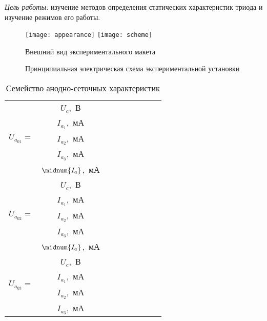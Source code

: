 \documentclass[10pt,pscyr,nonums]{hedlabwork}
\begin{document}
    \makeheader

    \emph{Цель работы:} изучение методов определения статических характеристик
    триода и изучение режимов его работы.
    
    \begin{figure}[h!]
        \center
        \texttt{[image: appearance]} \hspace*{2em}
        \texttt{[image: scheme]}
        \parbox{.45\textwidth}{\caption{Внешний вид экспериментального макета}}
        \hspace*{2em}
        \parbox{.4\textwidth}{\caption{Принципиальная электрическая схема
        экспериментальной установки}}
    \end{figure}
    
    \begin{table}[h!]
        \center
        \caption{Семейство анодно-сеточных характеристик}
        \begin{tabular}{|m{}|*{8}{C{.07}|}} \hline
         & \( U_c \),~В &
            &&&&&& \\ 
        & \( I_{a_1} \),~мА &
            &&&&&& \\ 
        & \( I_{a_2} \),~мА &
            &&&&&& \\ 
        & \( I_{a_3} \),~мА &
            &&&&&& \\ 
        & \( \midnum{I_a} \),~мА &
            &&&&&& \\ \hline
         & \( U_c \),~В &
            &&&&&& \\ 
        & \( I_{a_1} \),~мА &
            &&&&&& \\ 
        & \( I_{a_2} \),~мА &
            &&&&&& \\ 
        & \( I_{a_3} \),~мА &
            &&&&&& \\ 
        & \( \midnum{I_a} \),~мА &
            &&&&&& \\ \hline
         & \( U_c \),~В &
            &&&&&& \\ 
        & \( I_{a_1} \),~мА &
            &&&&&& \\ 
        & \( I_{a_2} \),~мА &
            &&&&&& \\ 
        & \( I_{a_3} \),~мА &
            &&&&&& \\ 

\end{tabular}
\end{table}
\end{document}
